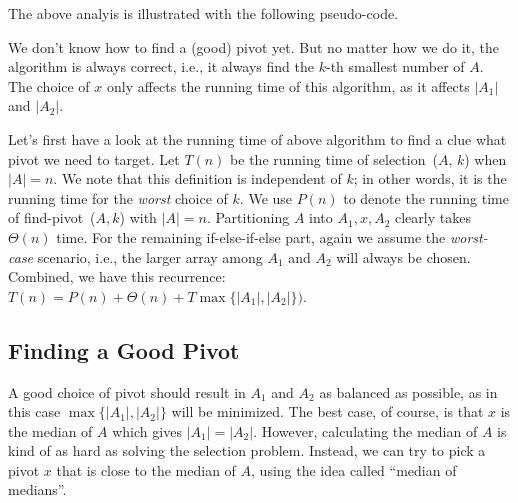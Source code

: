 The above analyis is illustrated with the following pseudo-code.

\begin{minipage}{0.8\textwidth}
	\xxx
	\aab {\textcolor{blue}{$x$ = find-pivot~($A$)};}\xxx
	\xxx
	\xxx
	\xxx
	\xxx
	\xxx
\end{minipage}

We don't know how to find a (good) pivot yet.
But no matter how we do it, the algorithm is always correct, i.e., it always find the $k$-th smallest number of $A$.
The choice of $x$ only affects the running time of this algorithm, as it affects $|A_1|$ and $|A_2|$.


Let's first have a look at the running time
of above algorithm to find a clue what pivot we need to target.
Let $T(n)$ be the running time of selection~($A$, $k$) when $|A| = n$. We note that this definition is independent of $k$;
in other words, it is the running time for the \emph{worst} choice of $k$.
We use $P(n)$ to denote the running time of find-pivot~($A,k$) with $|A| = n$.
Partitioning $A$ into $A_1,x,A_2$ clearly takes $\Theta(n)$ time.
For the remaining if-else-if-else part, again we assume the \emph{worst-case} scenario, i.e.,
the larger array among $A_1$ and $A_2$ will always be chosen.
Combined, we have this recurrence: $T(n) = P(n) + \Theta(n) + T\max\{|A_1|, |A_2|\})$.

\subsection*{Finding a Good Pivot}

A good choice of pivot should result in $A_1$ and $A_2$ as balanced as possible, as in this case 
$\max\{|A_1|, |A_2|\}$ will be minimized. %
The best case, of course, is that $x$ is the median of $A$ which gives $|A_1| = |A_2|$. 
However, calculating the median of $A$ is kind of as hard as solving the selection problem.
Instead, we can try to pick a pivot $x$ that is close to the median of $A$, using the idea called ``median of medians''.

